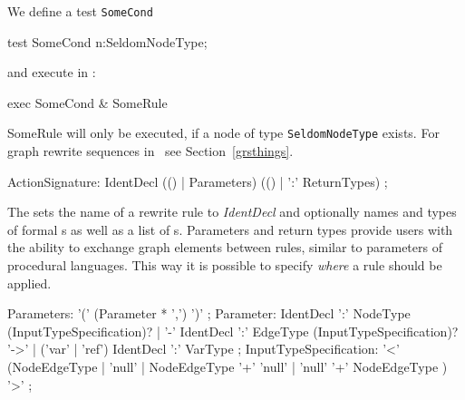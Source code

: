 \begin{example}
\label{ex:rulelang:testrule}
We define a test \texttt{SomeCond}
\begin{grgen}
test SomeCond {
  n:SeldomNodeType;
}
\end{grgen}
and execute in \GrShell:
\begin{grshell}
  exec SomeCond & SomeRule
\end{grshell}
SomeRule will only be executed, if a node of type \texttt{SeldomNodeType} exists.
For graph rewrite sequences in \GrShell\ see Section~\ref{grsthings}.
\end{example}

\begin{rail}
  ActionSignature: IdentDecl (() | Parameters) (() | ':' ReturnTypes) ;
\end{rail}
The  sets the name of a rewrite rule to \emph{IdentDecl} and optionally names and types of formal s as well as a list of s.
Parameters and return types provide users with the ability to exchange graph elements between rules, similar to parameters of procedural languages.
This way it is possible to specify \emph{where} a rule should be applied.

\begin{rail}
  Parameters: '(' (Parameter * ',') ')' ;
  Parameter: IdentDecl ':' NodeType (InputTypeSpecification)? | '-' IdentDecl ':' EdgeType (InputTypeSpecification)? '->' | ('var' | 'ref') IdentDecl ':' VarType ;
  InputTypeSpecification: '<' (NodeEdgeType | 'null' | NodeEdgeType '+' 'null' | 'null' '+' NodeEdgeType ) '>' ;
\end{rail}

